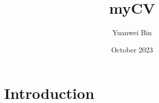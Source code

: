 \documentclass{article}
\title{myCV}
\author{Yuanwei Bin}
\date{October 2023}
\begin{document}
\maketitle

\section{Introduction}
\end{document}
